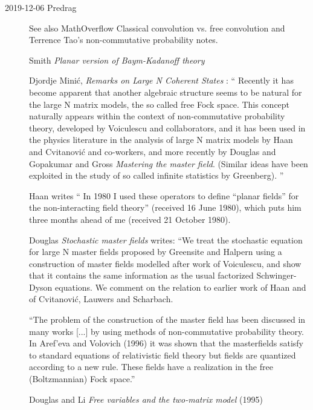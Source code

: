 \begin{description}
\item[2019-12-06 Predrag]
See also MathOverflow
{Classical convolution vs. free convolution}
and Terrence Tao's
{non-commutative probability} notes.

Smith {\em Planar version of {Baym-Kadanoff} theory}

Djordje Mini\'c, {\em Remarks on Large N Coherent States}
: `` Recently it has become apparent that another
algebraic structure seems to be natural for the large N matrix models,
the so called free Fock space. This concept naturally appears within the
context of non-commutative probability theory, developed by Voiculescu
and collaborators, and it has been used in the physics
literature in the analysis of large N matrix models by Haan and
Cvitanovi\'c and co-workers\emph{}, and more recently by
Douglas and Gopakumar and Gross {\em Mastering
the master field}. (Similar ideas have been exploited in the study of so
called infinite statistics by Greenberg).
''

Haan writes `` In 1980 I used these operators to define ``planar fields''
for the non-interacting field theory'' (received 16 June
1980), which puts him three months ahead of me (received
21 October 1980).

Douglas {\em Stochastic master fields} writes: ``We treat
the stochastic equation for large N master fields proposed by Greensite
and Halpern using a construction of master fields modelled after work of
Voiculescu, and show that it contains the same information as the usual
factorized Schwinger-Dyson equations. We comment on the relation to
earlier work of Haan and of Cvitanovi\'c, Lauwers and
Scharbach.

``The problem of the construction of the master field has been discussed in
many works [...] by using methods of non-commutative
probability theory. In Aref'eva and Volovich (1996)
it was shown that the masterfields satisfy to standard equations of
relativistic field theory but fields are quantized according to a new
rule. These fields have a realization in the free (Boltzmannian)
Fock space.''

Douglas and Li
{\em Free variables and the two-matrix model} (1995)


\end{description}
